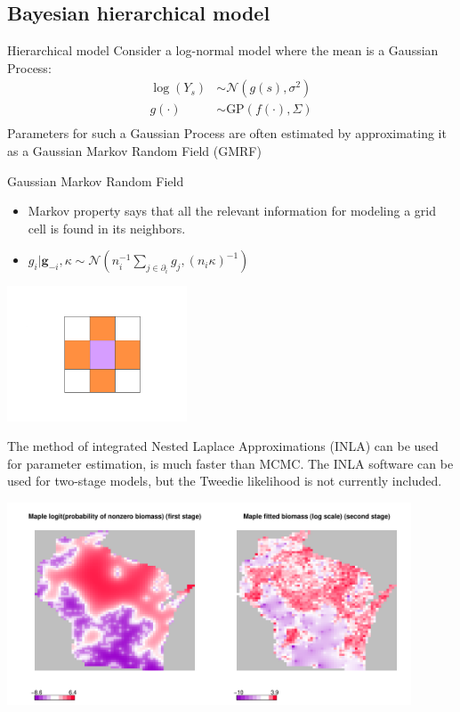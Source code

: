 \documentclass{beamer}
\begin{document}
\subsection{Bayesian hierarchical model}

\begin{frame}{Hierarchical model}
Consider a log-normal model where the mean is a Gaussian Process:
  \begin{align*}
    \log(Y_s) &\sim \mathcal{N} \left( g(s), \sigma^2 \right)\\
    g(\cdot) &\sim \text{GP}(f(\cdot), \Sigma)\\
  \end{align*}
  Parameters for such a Gaussian Process are often estimated by approximating it as a Gaussian Markov Random Field (GMRF)
\end{frame}


\begin{frame}{Gaussian Markov Random Field}
  \begin{itemize}
    \item Markov property says that all the relevant information for modeling a grid cell is found in its neighbors. 
    \item $g_i|\bm{g}_{-i}, \kappa \sim \mathcal{N}\left(n_i^{-1} \sum \limits_{j \in \partial_i} g_j, (n_i \kappa)^{-1}\right)$
  \end{itemize}
  
  \begin{center}
    \includegraphics[width=0.4\textwidth]{../../figures/neighborhood.png}
  \end{center}  
\end{frame}

\begin{frame}
  The method of integrated Nested Laplace Approximations (INLA) can be used for parameter estimation, is much faster than MCMC. The INLA software can be used for two-stage models, but the Tweedie likelihood is not currently included.
  \begin{center}
    \includegraphics[width=0.9\textwidth]{../../figures/inla-delta/maple-fitted-heatmap.pdf}
  \end{center}
\end{frame}
\end{document}
